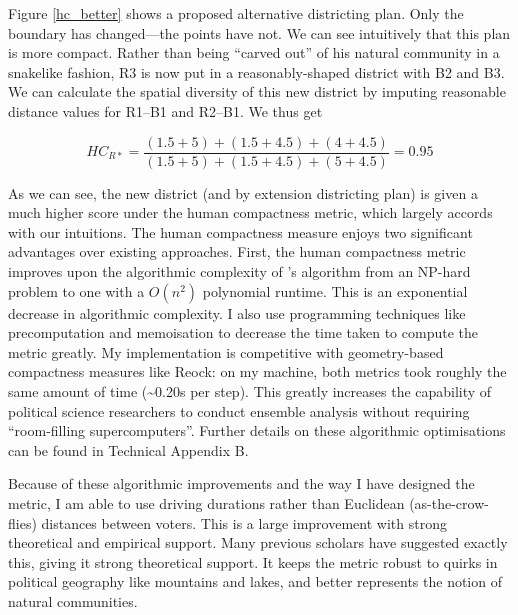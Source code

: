 \documentclass[]{article}
\begin{document}
Figure \ref{hc_better} shows a proposed alternative districting plan.
Only the boundary has changed---the points have not. We can see
intuitively that this plan is more compact. Rather than being ``carved
out'' of his natural community in a snakelike fashion, R3 is now put in
a reasonably-shaped district with B2 and B3. We can calculate the
spatial diversity of this new district by imputing reasonable distance
values for R1--B1 and R2--B1. We thus get

\[HC_{R*} = \frac{(1.5 + 5) + (1.5+4.5) + (4 + 4.5)}{(1.5+5) + (1.5+4.5) + (5+4.5)} = 0.95\]

As we can see, the new district (and by extension districting plan) is
given a much higher score under the human compactness metric, which
largely accords with our intuitions. The human compactness measure
enjoys two significant advantages over existing approaches. First, the
human compactness metric improves upon the algorithmic complexity of
\citeauthor{fh2011}'s algorithm from an NP-hard problem to one with a
\(O(n^2)\) polynomial runtime. This is an exponential decrease in
algorithmic complexity. I also use programming techniques like
precomputation and memoisation to decrease the time taken to compute the
metric greatly. My implementation is competitive with geometry-based
compactness measures like Reock: on my machine, both metrics took
roughly the same amount of time (\textasciitilde{}0.20s per step). This
greatly increases the capability of political science researchers to
conduct ensemble analysis without requiring ``room-filling
supercomputers''. Further details on these algorithmic optimisations can
be found in Technical Appendix B.

Because of these algorithmic improvements and the way I have designed
the metric, I am able to use driving durations rather than Euclidean
(as-the-crow-flies) distances between voters. This is a large
improvement with strong theoretical and empirical support. Many previous
scholars have suggested exactly this, giving it strong theoretical
support. It keeps the metric robust to quirks in political geography
like mountains and lakes, and better represents the notion of natural
communities.
\end{document}
